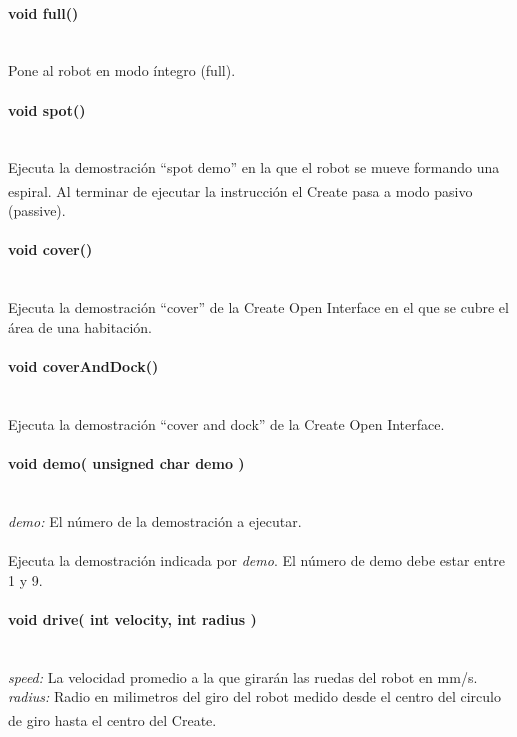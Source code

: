\documentclass[letterpaper,openright,12pt]{book}
\begin{document}
\paragraph{void full()}\mbox{}\\
Pone al robot en modo íntegro (full).\\

\paragraph{void spot()}\mbox{}\\
Ejecuta la demostración ``spot demo'' en la que el robot se mueve formando una espiral. Al terminar de ejecutar la instrucción el Create\textsuperscript{\textregistered} pasa a modo pasivo (passive).\\

\paragraph{void cover()}\mbox{}\\
Ejecuta la demostración ``cover'' de la Create Open Interface en el que se cubre el área de una habitación.\\

\paragraph{void coverAndDock()}\mbox{}\\
Ejecuta la demostración ``cover and dock'' de la Create Open Interface.

\paragraph{void demo( unsigned char demo )}\mbox{}\\
\emph{demo: } El número de la demostración a ejecutar.\\\\
Ejecuta la demostración indicada por \emph{demo}. El número de demo debe estar entre 1 y 9.\\
\paragraph{void drive( int velocity, int radius )}\mbox{}\\
\emph{speed: } La velocidad promedio a la que girarán las ruedas del robot en mm/s.\\
\emph{radius: }Radio en milimetros del giro del robot medido desde el centro del circulo de giro hasta el centro del Create\textsuperscript{\textregistered}.\\\\
\end{document}
